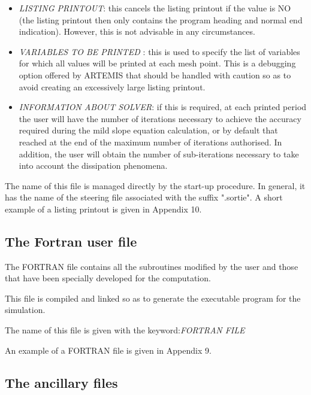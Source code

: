 \begin{itemize}
\item  \textit{LISTING PRINTOUT}: this cancels the listing printout if the
  value is NO (the listing printout then only contains the program heading and
    normal end indication). However, this is not advisable in any
    circumstances.

\item  \textit{VARIABLES TO BE PRINTED} : this is used to specify the list of
  variables for which all values will be printed at each mesh point. This is a
    debugging option offered by ARTEMIS that should be handled with caution so
    as to avoid creating an excessively large listing printout.

\item  \textit{INFORMATION ABOUT SOLVER}: if this is required, at each printed
  period the user will have the number of iterations necessary to achieve the
    accuracy required during the mild slope equation calculation, or by default
    that reached at the end of the maximum number of iterations authorised. In
    addition, the user will obtain the number of sub-iterations necessary to
    take into account the dissipation phenomena.
\end{itemize}

The name of this file is managed directly by the \artemis{} start-up procedure.
In general, it has the name of the steering file associated with
the suffix ".sortie". A short example of a listing printout is given in Appendix
10.


\subsection{The Fortran user file}

The FORTRAN file contains all the \artemis{} subroutines modified by the user
and those that have been specially developed for the computation.

This file is compiled and linked so as to generate the executable program for
the simulation.

The name of this file is given with the keyword:\textit{FORTRAN FILE}

An example of a FORTRAN file is given in Appendix 9.


\subsection{The ancillary files}

